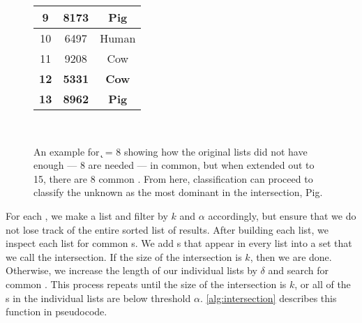\begin{figure}
{\begin{tabular}{c|c|c}
 \bf 9      &\bf   8173 &\bf Pig \\ \hline
 10         &      6497 & Human \\ \hline
 11         &      9208 & Cow \\ \hline
 \bf 12     &\bf   5331 &\bf Cow \\ \hline
 \bf 13     &\bf   8962 &\bf Pig \\ \hline
\end{tabular}
}
\\
\caption{An example \rintersect{} for \k{} = 8 showing how the original \knnlong{} lists did not have enough \isols{} --- 8 are needed --- in common, but when extended out to 15, there are 8 common \isols{}. From here, classification can proceed to classify the unknown as the most dominant \spec{} in the intersection, Pig.}
\label{fig:intersection:example}
\end{figure}

For each \compfunc{}, we make a \knnlong{} list and filter by $k$ and $\alpha$ accordingly, but ensure that we do not lose track of the entire sorted list of results.
After building each \knnlong{} list, we inspect each list for common \isol{}s.
We add \isol{}s that appear in every list into a set that we call the intersection.
If the size of the intersection is $k$, then we are done.
Otherwise, we increase the length of our individual lists by $\delta$ and search for common \isol{}.
This process repeats until the size of the intersection is $k$, or all of the \isol{}s in the individual lists are below threshold $\alpha$.
\autoref{alg:intersection} describes this function in pseudocode.

